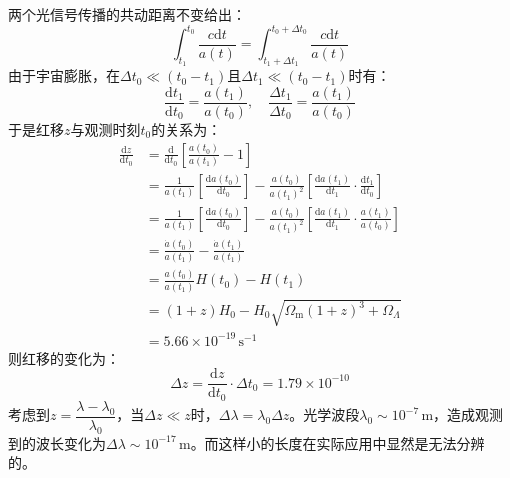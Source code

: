 \documentclass[a4paper,fontset=none]{ctexart}
\begin{document}
\begin{itemize}
    两个光信号传播的共动距离不变给出：
    \[
    \int_{t_1}^{t_0}\frac{c\mathrm{d}t}{a(t)} = \int_{t_1+\Delta t_1}^{t_0+\Delta t_0}\frac{c\mathrm{d}t}{a(t)}
    \]
    由于宇宙膨胀，在$\Delta t_0\ll(t_0-t_1)$且$\Delta t_1\ll(t_0-t_1)$时有：
    \[
    \frac{\mathrm{d}t_1}{\mathrm{d}t_0} = \frac{a(t_1)}{a(t_0)},\quad
        \frac{\Delta t_1}{\Delta t_0} = \frac{a(t_1)}{a(t_0)}
    \]
    于是红移$z$与观测时刻$t_0$的关系为：
    \begin{align*}
        \frac{\mathrm{d}z}{\mathrm{d}t_0}
        &= \frac{\mathrm{d}}{\mathrm{d}t_0}\left[\frac{a(t_0)}{a(t_1)}-1\right] \\
        &= \frac{1}{a(t_1)}\left[\frac{\mathrm{d}a(t_0)}{\mathrm{d}t_0}\right] - \frac{a(t_0)}{a(t_1)^2}\left[\frac{\mathrm{d}a(t_1)}{\mathrm{d}t_1} \cdot \frac{\mathrm{d}t_1}{\mathrm{d}t_0}\right] \\
        &= \frac{1}{a(t_1)}\left[\frac{\mathrm{d}a(t_0)}{\mathrm{d}t_0}\right] - \frac{a(t_0)}{a(t_1)^2}\left[\frac{\mathrm{d}a(t_1)}{\mathrm{d}t_1} \cdot \frac{a(t_1)}{a(t_0)}\right] \\
        &= \frac{\dot{a}(t_0)}{a(t_1)} - \frac{\dot{a}(t_1)}{a(t_1)} \\
        &= \frac{a(t_0)}{a(t_1)}H(t_0) - H(t_1) \\
        &= (1+z)H_0 - H_0\sqrt{\Omega_\mathrm{m}(1+z)^3+\Omega_\Lambda} \\
        &= 5.66\times10^{-19}\,\mathrm{s}^{-1}
    \end{align*}
    则红移的变化为：
    \[
    \Delta z = \frac{\mathrm{d}z}{\mathrm{d}t_0}\cdot\Delta t_0 = 1.79\times10^{-10}
    \]
    考虑到$z=\dfrac{\lambda-\lambda_0}{\lambda_0}$，当$\Delta z\ll z$时，$\Delta\lambda=\lambda_0\Delta z$。光学波段$\lambda_0\sim10^{-7}\,\mathrm{m}$，造成观测到的波长变化为$\Delta\lambda\sim10^{-17}\,\mathrm{m}$。而这样小的长度在实际应用中显然是无法分辨的。

\end{itemize}
\end{document}

